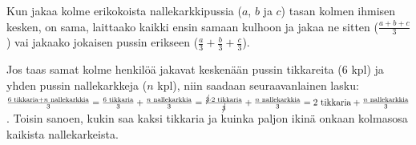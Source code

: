 Kun jakaa kolme erikokoista nallekarkkipussia ($a$, $b$ ja $c$) tasan kolmen ihmisen kesken, on sama, laittaako kaikki ensin samaan kulhoon ja jakaa ne sitten ($\frac{a+b+c}{3}$) vai jakaako jokaisen pussin erikseen ($ \frac{a}{3} + \frac{b}{3} + \frac{c}{3}$).

Jos taas samat kolme henkilöä jakavat keskenään pussin tikkareita ($6$ kpl) ja yhden pussin nallekarkkeja ($n$ kpl), niin saadaan seuraavanlainen lasku: $ \frac{6\text{ tikkaria}+n\text{ nallekarkkia}}{3} = \frac{6\text{ tikkaria}}{3} + \frac{n\text{ nallekarkkia}}{3} = \frac{\cancel{3} \cdot 2\text{ tikkaria}}{\cancel{3}} + \frac{n\text{ nallekarkkia}}{3} = 2\text{ tikkaria} + \frac{n\text{ nallekarkkia}}{3}$. Toisin sanoen, kukin saa kaksi tikkaria ja kuinka paljon ikinä onkaan kolmasosa kaikista nallekarkeista.

